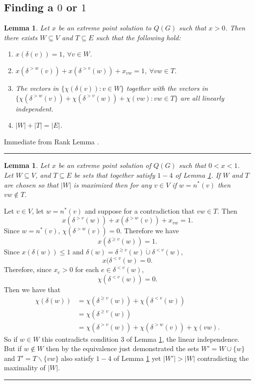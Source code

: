 \documentclass[preprint]{elsarticle}
\newtheorem{lemma}[fact]{Lemma}
\newenvironment{proof}{{\bf Proof:  }}{\hfill\rule{2mm}{2mm}}
\begin{document}
\newpage

\subsection{Finding a $0$ or $1$}

\begin{lemma}
Let $x$ be an extreme point solution to $Q(G)$ such that $x>0$. Then there exists $W \subseteq V$ and $T \subseteq E$ such that the following hold:
\label{lemma:rank}
\begin{enumerate}
\item $x(\delta(v)) = 1$, $\forall v \in W$.
\item $x(\delta^{>w}(v)) + x(\delta^{>v}(w)) + x_{vw} = 1$, $\forall vw \in T$.
\item The vectors in $\{\chi(\delta(v)) : v \in W\}$ together with the vectors in $\{\chi(\delta^{>w}(v)) + \chi(\delta^{>v}(w)) + \chi(vw) : vw \in T\}$ are all linearly independent.
\item $|W| + |T| = |E|$.
\end{enumerate}
\end{lemma}
\begin{proof}
Immediate from Rank Lemma \cite{lau2011iterative}. 
\end{proof}
\begin{lemma}
Let $x$ be an extreme point solution of $Q(G)$ such that $0 < x < 1$. Let $W \subseteq V$, and $T \subseteq E$ be sets that together satisfy $1-4$ of Lemma \ref{lemma:rank}. If $W$ and $T$ are chosen so that $|W|$ is maximized then for any $v \in V$ if $w = n^*(v)$ then $vw \not\in T$.
\label{lemma:fav}
\end{lemma}
\begin{proof}
Let $v \in V$, let $w = n^*(v)$ and suppose for a contradiction that $vw \in T$. Then 
$$x(\delta^{>v}(w)) + x(\delta^{>w}(v)) + x_{vw} = 1. $$
Since $w = n^*(v)$, $\chi(\delta^{>w}(v)) = 0$. Therefore we have
$$x(\delta^{\geq v}(w)) = 1.$$
Since $x(\delta(w)) \leq 1$ and $\delta(w) = \delta^{\geq v}(w) \dot\cup \delta^{< v}(w)$, $$x(\delta^{<v}(w) = 0. $$
Therefore, since $x_e > 0$ for each $e \in \delta^{< v}(w)$, $$\chi(\delta^{< v}(w)) = 0.$$
Then we have that
\begin{align*}
\chi(\delta(w)) &= \chi(\delta^{\geq v}(w)) + \chi(\delta^{<v}(w)) \\
&= \chi(\delta^{\geq v}(w)) \\
&= \chi(\delta^{> v}(w)) + \chi(\delta^{> w}(v)) + \chi(vw).
\end{align*}
So if $w \in W$ this contradicts condition $3$ of Lemma \ref{lemma:rank}, the linear independence. But if $w \not\in W$ then by the equivalence just demonstrated the sets $W' = W \cup \{w\}$ and $T' = T \backslash \{vw\}$ also satisfy $1-4$ of Lemma \ref{lemma:rank} yet $|W'| > |W|$ contradicting the maximality of $|W|$. 
\end{proof}
\end{document}
